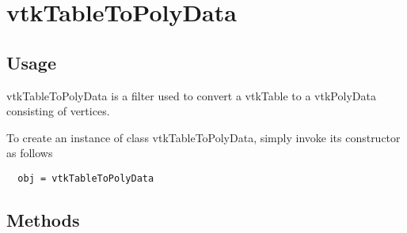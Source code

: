 \section{vtkTableToPolyData}

\subsection{Usage}

 vtkTableToPolyData is a filter used to convert a vtkTable  to a vtkPolyData
 consisting of vertices.

To create an instance of class vtkTableToPolyData, simply
invoke its constructor as follows
\begin{verbatim}
  obj = vtkTableToPolyData
\end{verbatim}
\subsection{Methods}

